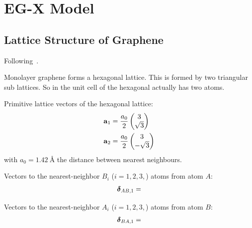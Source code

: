 \chapter{EG-X Model}\label{ch:eg-x-model}

\section{Lattice Structure of Graphene}\label{sec:lattice-structure-of-graphene}

Following~\cite{Yang_Li_Lee_Ng_2018}.

Monolayer graphene forms a hexagonal lattice.
This is formed by two triangular sub lattices.
So in the unit cell of the hexagonal actually has two atoms.

Primitive lattice vectors of the hexagonal lattice:
\begin{align}
    \bm{\mathrm{a}}_1 &= \frac{a_0}{2} \begin{pmatrix} 3 \\ \sqrt{3} \end{pmatrix} \\
    \bm{\mathrm{a}}_2 &= \frac{a_0}{2} \begin{pmatrix} 3 \\ -\sqrt{3} \end{pmatrix}
\end{align}
with \(a_0 = \SI{1.42}{\angstrom}\) the distance between nearest neighbours.


Vectors to the nearest-neighbor \(B_i\) (\(i = 1, 2, 3,\)) atoms from atom \(A\):
\begin{align}
    \bm{\mathrm{\delta}}_{AB, 1} =
\end{align}

Vectors to the nearest-neighbor \(A_i\) (\(i = 1, 2, 3,\)) atoms from atom \(B\):
\begin{align}
    \bm{\mathrm{\delta}}_{BA, 1} =
\end{align}

